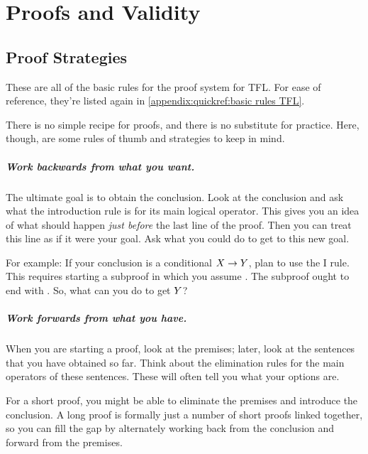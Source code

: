 \chapter{Proofs and Validity}


\section{Proof Strategies}

\begin{highlighted}
	{These are all of the basic rules for the proof system for TFL.} For ease of reference, they're listed again in \cref{appendix:quickref:basic rules TFL}.
\end{highlighted}

There is no simple recipe for proofs, and there is no substitute for practice. Here, though, are some rules of thumb and strategies to keep in mind.

\paragraph{Work backwards from what you want.}
The ultimate goal is to obtain the conclusion. Look at the conclusion and ask what the introduction rule is for its main logical operator. This gives you an idea of what should happen \emph{just before} the last line of the proof. Then you can treat this line as if it were your goal. Ask what you could do to get to this new goal.

For example: If your conclusion is a conditional $X\rightarrow Y$, plan to use the {\eif}I rule. This requires starting a subproof in which you assume \metaX. The subproof ought to end with \metaY. So, what can you do to get $Y$?

\paragraph{Work forwards from what you have.}
When you are starting a proof, look at the premises; later, look at the sentences that you have obtained so far. Think about the elimination rules for the main operators of these sentences. These will often tell you what your options are.

For a short proof, you might be able to eliminate the premises and introduce the conclusion. A long proof is formally just a number of short proofs linked together, so you can fill the gap by alternately working back from the conclusion and forward from the premises.


